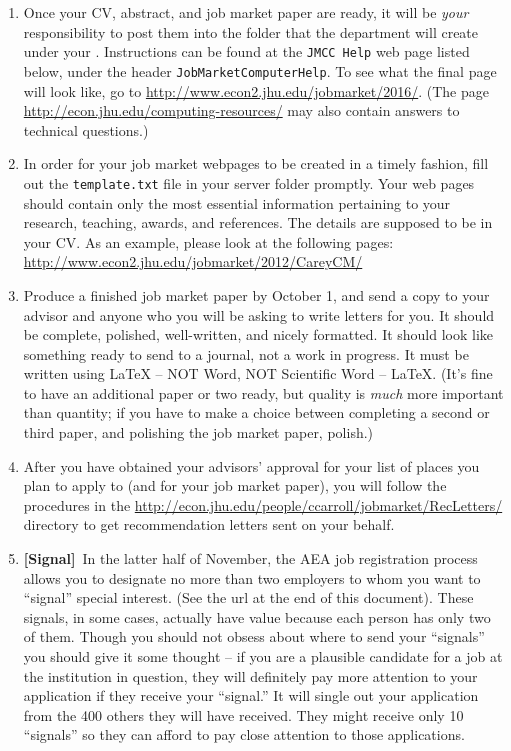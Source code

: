 \documentclass{econtex}
\begin{document}
\begin{enumerate}
\item Once your CV, abstract, and job market paper are ready, it will
  be {\it your} responsibility to post them into the folder that
  the department will create under your \Moniker.
  Instructions can be found at the \texttt{JMCC Help} web page listed
  below, under the header \texttt{JobMarketComputerHelp}.  To see what
  the final page will look like, go to
  \url{http://www.econ2.jhu.edu/jobmarket/2016/}.  (The page
  \url{http://econ.jhu.edu/computing-resources/}
  may also contain answers to technical questions.)
  
\item In order for your job market webpages to be created in a timely fashion, 
  fill out the \texttt{template.txt} file in your server folder promptly.
  Your web pages should contain only the most essential information 
  pertaining to your research, teaching, awards, and references. 
  The details are supposed to be in your CV.
  As an example, please look at the following pages:\\
  \url{http://www.econ2.jhu.edu/jobmarket/2012/CareyCM/}
  

\item Produce a finished job market paper by October 1, and send a copy to your advisor and anyone who you will be asking to write letters for you.  It should
  be complete, polished, well-written, and nicely formatted.  It
  should look like something ready to send to a journal, not a work in
  progress.  It must be written using {\LaTeX} -- NOT Word, NOT Scientific Word -- {\LaTeX}.  (It's fine to have an
  additional paper or two ready, but quality is {\it much} more
  important than quantity; if you have to make a choice between completing a second or third paper, and 
polishing the job market paper, polish.)
  
\item After you have obtained your advisors' approval for your list of
  places you plan to apply to (and for your job market paper), you
  will follow the procedures in the
  \url{http://econ.jhu.edu/people/ccarroll/jobmarket/RecLetters/}
  directory to get recommendation letters sent on your behalf.
  
\item \ifdvi\hypertarget{Signal}{{\bf [Signal]}~}\fi In the latter half of November, the AEA job registration process 
  allows you to designate no more than two employers to whom you want
  to ``signal'' special interest.  (See the url at the end of this
  document).  These signals, in some cases, actually have value because 
each person has only two of them.  Though you should not obsess about 
where to send your ``signals'' you should give it some thought -- if you
are a plausible candidate for a job at the institution in question, they
will definitely pay more attention to your application if they receive your 
``signal.''  It will single out your application from the 400 others they will have received.
They might receive only 10 ``signals'' so they can afford to pay close attention
to those applications.
  

\end{enumerate}
\end{document}
